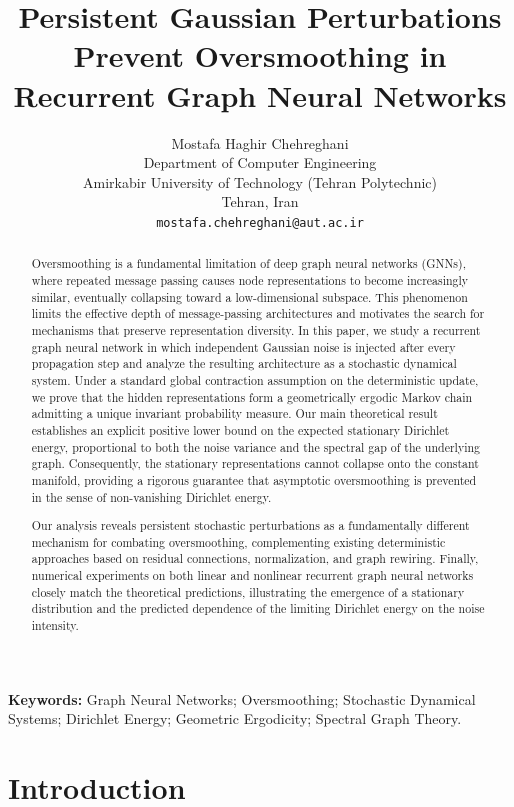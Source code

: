 \documentclass{article}
\title{Persistent Gaussian Perturbations Prevent Oversmoothing in Recurrent Graph Neural Networks}
\author{Mostafa Haghir Chehreghani\\
	Department of Computer Engineering\\
	Amirkabir University of Technology (Tehran Polytechnic)\\
	Tehran, Iran\\
	\texttt{mostafa.chehreghani@aut.ac.ir}}
\date{}
\begin{document}
	
	\maketitle
	
\begin{abstract}
	
	Oversmoothing is a fundamental limitation of deep graph neural networks
	(GNNs), where repeated message passing causes node representations to
	become increasingly similar, eventually collapsing toward a
	low-dimensional subspace. This phenomenon limits the effective depth of
	message-passing architectures and motivates the search for mechanisms
	that preserve representation diversity.
	In this paper, we study a recurrent graph neural network in which
	independent Gaussian noise is injected after every propagation step and
	analyze the resulting architecture as a stochastic dynamical system.
	Under a standard global contraction assumption on the deterministic
	update, we prove that the hidden representations form a geometrically
	ergodic Markov chain admitting a unique invariant probability measure.
	Our main theoretical result establishes an explicit positive lower bound
	on the expected stationary Dirichlet energy, proportional to both the
	noise variance and the spectral gap of the underlying graph.
	Consequently, the stationary representations cannot collapse onto the
	constant manifold, providing a rigorous guarantee that asymptotic
	oversmoothing is prevented in the sense of non-vanishing Dirichlet
	energy.
	
	Our analysis reveals persistent stochastic perturbations as a
	fundamentally different mechanism for combating oversmoothing, complementing
	existing deterministic approaches based on residual connections,
	normalization, and graph rewiring. Finally, numerical experiments on
	both linear and nonlinear recurrent graph neural networks closely match
	the theoretical predictions, illustrating the emergence of a stationary
	distribution and the predicted dependence of the limiting Dirichlet
	energy on the noise intensity.
	
\end{abstract}
	
	\textbf{Keywords:}
	Graph Neural Networks; Oversmoothing; Stochastic Dynamical Systems;
	Dirichlet Energy; Geometric Ergodicity; Spectral Graph Theory.
	
\section{Introduction}
\end{document}
